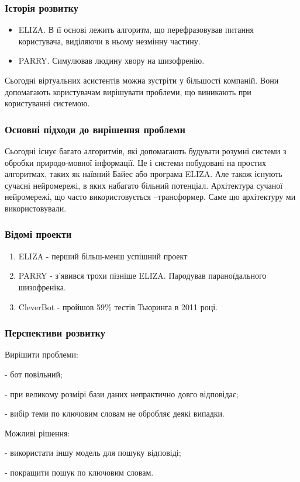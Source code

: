 \documentclass{beamer}
\begin{document}
\begin{frame}
    \frametitle{Історія розвитку}
    \begin{itemize}
        \item ELIZA.
        В її основі лежить алгоритм, що перефразовував питання користувача, виділяючи в ньому незмінну частину.

        \item PARRY.
        Симулював людину хвору на шизофренію.
    \end{itemize}

    Сьогодні віртуальних асистентів можна зустріти у більшості компаній. Вони допомагають користувачам вирішувати проблеми, що виникають при користуванні системою.
\end{frame}

\begin{frame}
    \frametitle{Основні підходи до вирішення проблеми}
    Сьогодні існує багато алгоритмів, які допомагають будувати розумні системи з обробки природо-мовної інформації. Це і системи побудовані на простих алгоритмах, таких як наївний Байес або програма ELIZA. Але також існують сучасні нейромережі, в яких набагато більний потенціал. Архітектура сучаної нейромережі, що часто використовується –трансформер. Саме цю архітектуру ми використовували.
\end{frame}

\begin{frame}
    \frametitle{Відомі проекти}
    \begin{enumerate}
        \item ELIZA - перший більш-менш успішний проект
        \item PARRY - з'явився трохи пізніше ELIZA. Пародував параноїдального шизофреніка.
        \item CleverBot - пройшов 59\% тестів Тьюринга в 2011 році.
    \end{enumerate}
\end{frame}

\begin{frame}
    \frametitle{Перспективи розвитку}
    Вирішити проблеми:

    - бот повільний;

    - при великому розмірі бази даних непрактично довго відповідає;

    - вибір теми по ключовим словам не обробляє деякі випадки.

    Можливі рішення:
    
    - використати іншу модель для пошуку відповіді;

    - покращити пошук по ключовим словам.
\end{frame}
\end{document}
